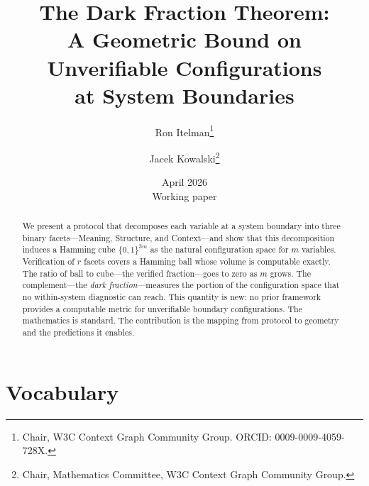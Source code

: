 \documentclass[11pt,a4paper]{article}
\title{The Dark Fraction Theorem:\\A Geometric Bound on Unverifiable Configurations\\at System Boundaries}
\author{Ron Itelman\thanks{Chair, W3C Context Graph Community Group. ORCID: 0009-0009-4059-728X.} \and Jacek Kowalski\thanks{Chair, Mathematics Committee, W3C Context Graph Community Group.}}
\date{April 2026\\Working paper}
\begin{document}
\maketitle

\begin{abstract}
We present a protocol that decomposes each variable at a system boundary into three binary facets---Meaning, Structure, and Context---and show that this decomposition induces a Hamming cube $\{0,1\}^{3m}$ as the natural configuration space for $m$ variables. Verification of $r$ facets covers a Hamming ball whose volume is computable exactly. The ratio of ball to cube---the verified fraction---goes to zero as $m$ grows. The complement---the \emph{dark fraction}---measures the portion of the configuration space that no within-system diagnostic can reach. This quantity is new: no prior framework provides a computable metric for unverifiable boundary configurations. The mathematics is standard. The contribution is the mapping from protocol to geometry and the predictions it enables.
\end{abstract}

\section*{Vocabulary}
\end{document}

